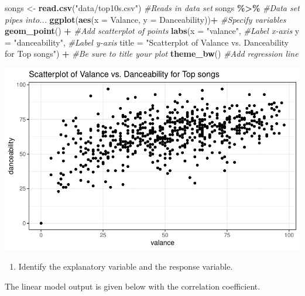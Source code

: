 \documentclass[
]{report}
\newenvironment{Shaded}{\begin{snugshade}}{\end{snugshade}}
\newcommand{\AttributeTok}[1]{\textcolor[rgb]{0.13,0.29,0.53}{#1}}
\newcommand{\CommentTok}[1]{\textcolor[rgb]{0.56,0.35,0.01}{\textit{#1}}}
\newcommand{\DecValTok}[1]{\textcolor[rgb]{0.00,0.00,0.81}{#1}}
\newcommand{\FunctionTok}[1]{\textcolor[rgb]{0.13,0.29,0.53}{\textbf{#1}}}
\newcommand{\NormalTok}[1]{#1}
\newcommand{\OtherTok}[1]{\textcolor[rgb]{0.56,0.35,0.01}{#1}}
\newcommand{\SpecialCharTok}[1]{\textcolor[rgb]{0.81,0.36,0.00}{\textbf{#1}}}
\newcommand{\StringTok}[1]{\textcolor[rgb]{0.31,0.60,0.02}{#1}}
\providecommand{\tightlist}{%
  \setlength{\itemsep}{0pt}\setlength{\parskip}{0pt}}
\begin{document}
\begin{Shaded}
\begin{Highlighting}[]
\NormalTok{songs }\OtherTok{\textless{}{-}} \FunctionTok{read.csv}\NormalTok{(}\StringTok{"data/top10s.csv"}\NormalTok{) }\CommentTok{\#Reads in data set}
\NormalTok{songs }\SpecialCharTok{\%\textgreater{}\%} \CommentTok{\#Data set pipes into...}
\FunctionTok{ggplot}\NormalTok{(}\FunctionTok{aes}\NormalTok{(}\AttributeTok{x =}\NormalTok{ Valance, }\AttributeTok{y =}\NormalTok{ Danceability))}\SpecialCharTok{+}  \CommentTok{\#Specify variables}
  \FunctionTok{geom\_point}\NormalTok{() }\SpecialCharTok{+}  \CommentTok{\#Add scatterplot of points}
  \FunctionTok{labs}\NormalTok{(}\AttributeTok{x =} \StringTok{"valance"}\NormalTok{,  }\CommentTok{\#Label x{-}axis}
       \AttributeTok{y =} \StringTok{"danceability"}\NormalTok{,  }\CommentTok{\#Label y{-}axis}
       \AttributeTok{title =} \StringTok{"Scatterplot of Valance vs. Danceability for Top songs"}\NormalTok{) }\SpecialCharTok{+} \CommentTok{\#Be sure to title your plot}
  \FunctionTok{theme\_bw}\NormalTok{()  }\CommentTok{\#Add regression line}
\end{Highlighting}
\end{Shaded}

\begin{center}\includegraphics[width=0.7\linewidth]{14-UR-module13_review_files/figure-latex/unnamed-chunk-1-1} \end{center}

\begin{enumerate}
\def\labelenumi{\arabic{enumi}.}
\tightlist
\item
  Identify the explanatory variable and the response variable.
\end{enumerate}

\newpage

The linear model output is given below with the correlation coefficient.

\begin{Shaded}
\end{Shaded}
\end{document}
